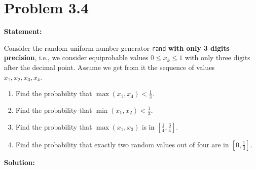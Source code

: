 \section*{Problem 3.4}

\textbf{Statement:}

Consider the random uniform number generator \texttt{rand} \textbf{with
    only 3 digits precision}, i.e., we consider equiprobable values
\( 0 \leq x_k \leq 1 \) with only three digits after the decimal
point. Assume we get from it the sequence of values \( x_1, x_2, x_3, x_4 \).

\begin{enumerate}
    \item Find the probability that \( \max(x_1, x_4) < \frac{1}{3} \).
    \item Find the probability that \( \min(x_1, x_2) < \frac{1}{3} \).
    \item Find the probability that \( \max(x_1, x_3) \) is in \( \left[ \frac{1}{4}, \frac{3}{4} \right] \).
    \item Find the probability that exactly two random values out of four are in \( \left[0, \frac{1}{3} \right] \).
\end{enumerate}

\noindent\textbf{Solution:}